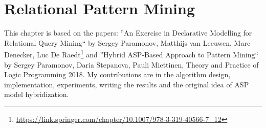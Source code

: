 \chapter{Relational Pattern Mining}\label{ch:StructuredMining}
This chapter is based on the papers: ''An Exercise in Declarative Modelling for Relational Query Mining`` by Sergey Paramonov, Matthijs van Leeuwen, Marc Denecker, Luc De Raedt\footnote{\url{https://link.springer.com/chapter/10.1007/978-3-319-40566-7_12}} and ''Hybrid ASP-Based Approach to Pattern Mining`` by Sergey Paramonov, Daria Stepanova, Pauli Miettinen, Theory and Practice of Logic Programming 2018. My contributions are in the algorithm design, implementation, experiments, writing the results and the original idea of ASP model hybridization.

\newcommand{\revision}[1]{#1\xspace}
%
%













\cleardoublepage
